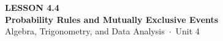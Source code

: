 \documentclass[aspectratio=169, 11pt]{beamer}
\begin{document}
{
\begin{frame}[plain]
  \vspace{2.8cm}\hspace{0.55cm}%
  \begin{minipage}{0.9\textwidth}
    {\color{goldacc}\bfseries\small LESSON 4.4}\\[0.5cm]
    {\color{white}\bfseries\LARGE Probability Rules and Mutually Exclusive Events}\\[1.2cm]
    {\color{mistmid}\small Algebra, Trigonometry, and Data Analysis~$\cdot$~Unit 4}
  \end{minipage}
\end{frame}
}

\begin{frame}[t, plain]
\end{frame}
\end{document}
